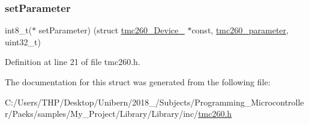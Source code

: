 \subsubsection{\texorpdfstring{set\+Parameter}{setParameter}}
{\footnotesize\ttfamily int8\+\_\+t($\ast$  set\+Parameter) (struct \mbox{\hyperlink{structtmc260___device__}{tmc260\+\_\+\+Device\+\_\+}} $\ast$const, \mbox{\hyperlink{tmc260_8h_af9376d3cf645591c7044d834be46c514}{tmc260\+\_\+parameter}}, uint32\+\_\+t)}



Definition at line 21 of file tmc260.\+h.



The documentation for this struct was generated from the following file\+:\begin{DoxyCompactItemize}
\item 
C\+:/\+Users/\+T\+H\+P/\+Desktop/\+Unibern/2018\+\_/\+Subjects/\+Programming\+\_\+\+Microcontroller/\+Paeks/samples/\+My\+\_\+\+Project/\+Library/\+Library/inc/\mbox{\hyperlink{tmc260_8h}{tmc260.\+h}}\end{DoxyCompactItemize}
